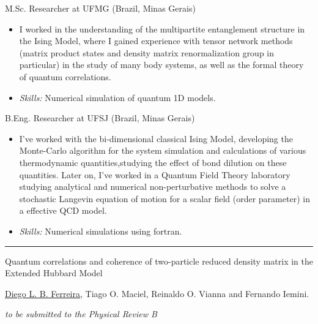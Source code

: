 \documentclass[a4paper,10pt]{article}
\newlength{\cvcolumngapwidth}
\newlength{\cvleftcolumnwidth}
\newlength{\cvrightcolumnwidth}
\newcommand{\cvsectionstyle}[1]{{\normalsize\cvsectionfont\textcolor{cvsectioncolor}{#1}}}
\newcommand{\cvtitlestyle}[1]{{\normalsize\cvtitlefont\textcolor{cvtitlecolor}{#1}}}
\newcommand{\cvdurationstyle}[1]{{\normalsize\cvdurationfont\textcolor{cvdurationcolor}{#1}}}
\newlength{\cvafteritemskipamount}
\newlength{\cvaftersectionskipamount}
\newlength{\cvaftertitleskipamount}
\newlength{\cvparskip}
\newcommand{\cvsection}[1]{
    \begin{minipage}[t]{\cvleftcolumnwidth}
        \raggedleft\cvsectionstyle{#1}
    \end{minipage}%
    \hspace{\cvcolumngapwidth}%
    \begin{minipage}[t]{\cvrightcolumnwidth}
        \textcolor{cvrulecolor}{\rule{\cvrightcolumnwidth}{0.5mm}}
    \end{minipage}
    \vspace{\cvaftersectionskipamount}}
\newcommand{\cvitem}[2]{
    \begin{minipage}[t]{\cvleftcolumnwidth}
        \raggedleft #1
    \end{minipage}%
    \hspace{\cvcolumngapwidth}%
    \begin{minipage}[t]{\cvrightcolumnwidth}
        \setlength{\parskip}{\cvparskip} #2
    \end{minipage}
    \vspace{\cvafteritemskipamount}}
\newcommand{\cvtitle}[1]{
    \cvtitlestyle{#1}
    \vspace{\cvaftertitleskipamount}
    \vspace{-\cvparskip}}
\begin{document}
\cvitem{\cvdurationstyle{2014 - 2016}}
    {\cvtitle{M.Sc. Researcher at UFMG (Brazil, Minas Gerais)}

    \begin{itemize}[leftmargin=*]
        \vspace{0.2cm}
        \item I worked in the understanding of the multipartite entanglement structure in the Ising Model, where I gained experience with tensor network methods (matrix product states and density matrix renormalization group in particular) in the study of many body systems, as well as the formal theory of quantum correlations.
        \vspace{0.2cm}
        \item \textit{Skills:} Numerical simulation of quantum 1D models.
    \end{itemize}}

\cvitem{\cvdurationstyle{2010 - 2013}}
    {\cvtitle{B.Eng. Researcher at UFSJ (Brazil, Minas Gerais)}
    
    \begin{itemize}[leftmargin=*]
        \vspace{0.2cm}
        \item I've worked with the bi-dimensional classical Ising Model, developing the Monte-Carlo algorithm for the system simulation and calculations of various thermodynamic quantities,studying the effect of bond dilution on these quantities. Later on, I’ve worked in a Quantum Field Theory laboratory studying analytical and numerical non-perturbative methods to solve a stochastic Langevin equation of motion for a scalar field (order parameter) in a effective QCD model.
        \vspace{0.2cm}
        \item \textit{Skills:} Numerical simulations using fortran.
    \end{itemize}}

    \newpage
\cvsection{Scientific Production}

\cvitem{\cvdurationstyle{Final Draft}}
    {\cvtitle{Quantum correlations and coherence of two-particle reduced density matrix in the Extended Hubbard Model}
    
    \vspace{0.2cm}
    \underline{Diego L. B. Ferreira}, Tiago O. Maciel, Reinaldo O. Vianna and Fernando Iemini.
    
    \vspace{0.2cm}
    \textit{to be submitted to the Physical Review B}}
\end{document}
